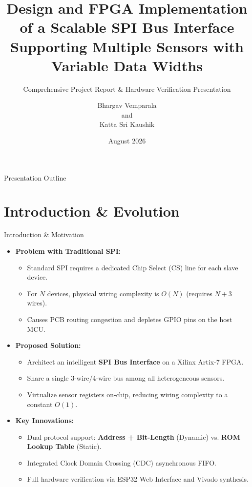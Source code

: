 \documentclass{beamer}
\title[Scalable SPI Bus Interface]{Design and FPGA Implementation of a Scalable SPI Bus Interface Supporting Multiple Sensors with Variable Data Widths}
\subtitle{Comprehensive Project Report \& Hardware Verification Presentation}
\author[Bhargav \& Kaushik]{Bhargav Vemparala \\ and \\ Katta Sri Kaushik}
\institute[Evaluation Board]{Department of Electrical and Computer Engineering \\ University Evaluation Board}
\date{August 2026}
\begin{document}
\begin{frame}
  \titlepage
\end{frame}

\begin{frame}{Presentation Outline}
  \tableofcontents
\end{frame}

\section{Introduction \& Evolution}

\begin{frame}{Introduction \& Motivation}
  \begin{itemize}
    \item \textbf{Problem with Traditional SPI:} 
    \begin{itemize}
      \item Standard SPI requires a dedicated Chip Select (CS) line for each slave device.
      \item For $N$ devices, physical wiring complexity is $O(N)$ (requires $N+3$ wires).
      \item Causes PCB routing congestion and depletes GPIO pins on the host MCU.
    \end{itemize}
    \vspace{0.2cm}
    \item \textbf{Proposed Solution:}
    \begin{itemize}
      \item Architect an intelligent \textbf{SPI Bus Interface} on a Xilinx Artix-7 FPGA.
      \item Share a single 3-wire/4-wire bus among all heterogeneous sensors.
      \item Virtualize sensor registers on-chip, reducing wiring complexity to a constant $O(1)$.
    \end{itemize}
    \vspace{0.2cm}
    \item \textbf{Key Innovations:}
    \begin{itemize}
      \item Dual protocol support: \textbf{Address + Bit-Length} (Dynamic) vs. \textbf{ROM Lookup Table} (Static).
      \item Integrated Clock Domain Crossing (CDC) asynchronous FIFO.
      \item Full hardware verification via ESP32 Web Interface and Vivado synthesis.
    \end{itemize}
  \end{itemize}
\end{frame}
\end{document}
